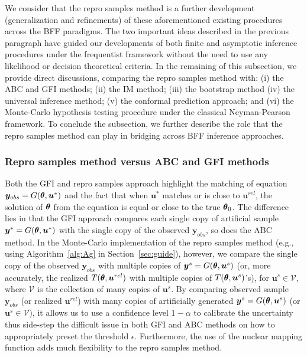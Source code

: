 \documentclass[12pt]{article}
\theoremstyle{shortspace}
\def\*#1{\bm{#1}}
\def\btheta{\mathop{\theta\kern-.45em\hbox{$\theta$}}\nolimits}
\begin{document}
We consider that the repro samples method is a further development (generalization and refinements) of these aforementioned existing procedures across the BFF paradigms. 
The two important ideas described in the previous paragraph have guided our developments of both finite and asymptotic inference procedures under the frequentist framework without the need to use any likelihood or decision theoretical criteria.
In the remaining of this subsection, we provide direct discussions, comparing the repro samples method with: (i) the ABC and GFI methods; (ii) the IM method; (iii) the bootstrap method
(iv) the universal inference method; (v) the conformal prediction approach; and (vi) the Monte-Carlo hypothesis testing procedure under the classical Neyman-Pearson framework. 
To conclude the subsection, we further describe the role that the repro samples method can play in bridging across BFF inference approaches. 

 
\subsubsection{Repro samples method versus ABC and GFI methods}
Both the GFI and repro samples approach highlight the matching of equation $\*y_{obs} = G(\btheta, \*u^*)$ and the fact that when $\*u^*$ matches or is close to $\*u^{rel}$, the solution of $\btheta$ from the equation is equal or close to the true $\btheta_0$. The difference lies in that the GFI approach compares each single copy of artificial sample $\*y^* = G(\btheta, \*u^*)$ with the single copy of the observed $\*y_{obs}$, so does the ABC method. In the Monte-Carlo implementation of the repro samples method (e.g., using  Algorithm~\ref{alg:Ag} in Section~\ref{sec:guide}), however, we compare the single copy of the observed $\*y_{obs}$ with multiple copies of $\*y^s = G(\btheta, \*u^s)$
(or, more accurately, the realized $T(\btheta, \*u^{rel})$ with multiple copies of $T(\btheta, \*u^s)$'s), for $\*u^s \in {\mathcal V}$, where ${\mathcal V}$ is the collection of many copies of $\*u^s$. By comparing observed sample $\*y_{obs}$ (or realized $\*u^{rel}$) with many copies of artificially generated $\*y^s = G(\btheta, \*u^s)$ (or $\*u^s \in {\mathcal V}$), it allows us to use a confidence level $1 - \alpha$ to calibrate the uncertainty thus side-step the difficult issue in both GFI and ABC methods on how to appropriately preset the
threshold $\epsilon$. Furthermore, the use of the nuclear mapping function adds much flexibility to the repro samples method. 
\end{document}
